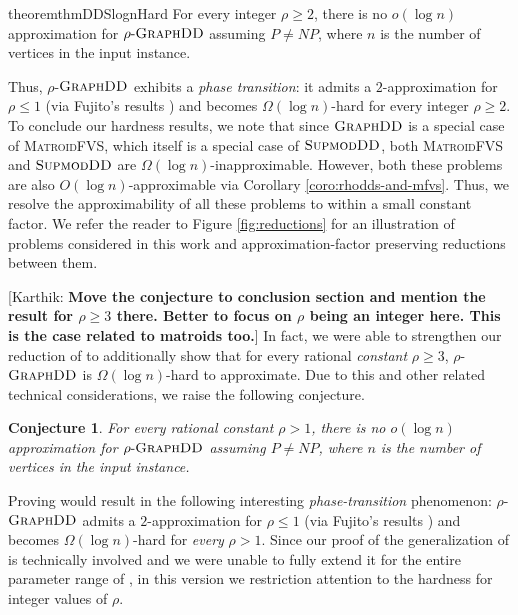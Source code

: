 \documentclass{article}
\newtheorem{conjecture}{Conjecture}[section]
\newcommand{\knote}[1]{{\color{red}[{\tiny Karthik: \bf #1}]\marginpar{\color{red}*}}}
\newcommand{\mfvs}{\textsc{MatroidFVS}\xspace}
\newcommand{\dds}{\ensuremath{\textsc{GraphDD}}\xspace}
\newcommand{\rhodds}[1]{\ensuremath{#1\text{-}\dds}\xspace}
\newcommand{\sdds}{\ensuremath{\textsc{SupmodDD}}\xspace}
\begin{document}
\begin{restatable}{theorem}{thmDDSlognHard}\label{thm:DDS-logn-hard}
For every integer $\rho \geq 2$,  there is no $o(\log n)$ approximation for \rhodds{\rho} assuming $P\neq NP$, where $n$ is the number of vertices in the input instance.
\end{restatable}

Thus, $\rho$-\dds exhibits a \emph{phase transition}: it admits a $2$-approximation for $\rho\le 1$ (via Fujito's results \cite{Fujito-matroid-fvs}) and becomes $\Omega(\log{n})$-hard for every integer $\rho\ge 2$. To conclude our hardness results, we note that since \dds is a special case of  \mfvs, which itself is a special case of \sdds, both \mfvs and \sdds are $\Omega(\log n)$-inapproximable. However, both these problems are also $O(\log{n})$-approximable via Corollary \ref{coro:rhodds-and-mfvs}. Thus, we resolve the approximability of all these problems to within a small constant factor. We refer the reader to Figure \ref{fig:reductions} for an illustration of problems considered in this work and approximation-factor preserving reductions between them.


\iffalse
\knote{Move the conjecture to conclusion section and mention the result for $\rho\ge 3$ there. Better to focus on $\rho$ being an integer here. This is the case related to matroids too.}
In fact, we were able to strengthen our reduction of  to additionally show that  for every rational \emph{constant} $\rho \geq 3$,  $\rho$-\dds is $\Omega(\log n)$-hard to approximate.  Due to this and other related technical considerations, we raise the following conjecture.
\begin{conjecture}\label{conj:phase-transition}
For every rational constant $\rho > 1$,  there is no $o(\log n)$ approximation for \rhodds{\rho} assuming $P\neq NP$, where $n$ is the number of vertices in the input instance.
\end{conjecture}

Proving  would result in the following interesting \emph{phase-transition} phenomenon: $\rho$-\dds admits a $2$-approximation for $\rho\le 1$ (via Fujito's results \cite{Fujito-matroid-fvs}) and becomes $\Omega(\log{n})$-hard for \emph{every} $\rho>1$.  Since our proof of the generalization of  is technically involved and we were unable to fully extend it for the entire parameter range of , in this version we restriction attention to the hardness for integer values of $\rho$. 
\end{document}

